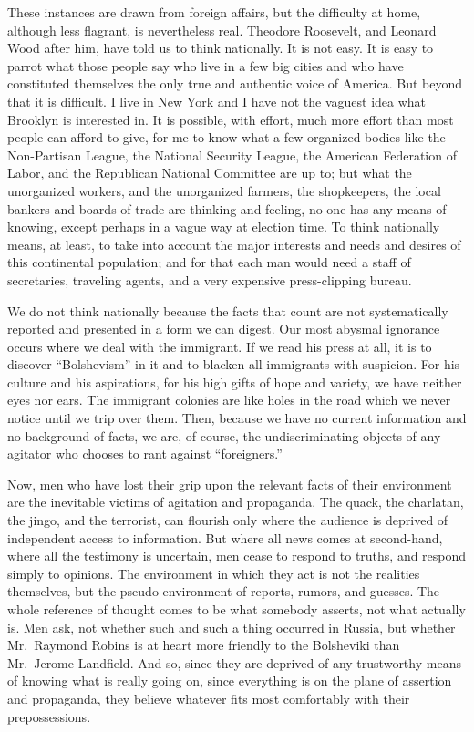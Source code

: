 \documentclass[openany,nobib,twoside,nohyper]{tufte-book}
\begin{document}
These instances are drawn from foreign affairs, but the difficulty at
home, although less flagrant, is nevertheless real. Theodore Roosevelt,
and Leonard Wood after him, have told us to think nationally. It is not
easy. It is easy to parrot what those people say who live in a few big
cities and who have constituted themselves the only true and authentic
voice of America. But beyond that it is difficult. I live in New York
and I have not the vaguest idea what Brooklyn is interested in. It is
possible, with effort, much more effort than most people can afford to
give, for me to know what a few organized bodies like the Non-Partisan
League, the National Security League, the American Federation of Labor,
and the Republican National Committee are up to; but what the
unorganized workers, and the unorganized farmers, the shopkeepers, the
local bankers and boards of trade are thinking and feeling, no one has
any means of knowing, except perhaps in a vague way at election time. To
think nationally means, at least, to take into account the major
interests and needs and desires of this continental population; and for
that each man would need a staff of secretaries, traveling agents, and a
very expensive press-clipping bureau.

We do not think nationally because the facts that count are not
systematically reported and presented in a form we can digest. Our most
abysmal ignorance occurs where we deal with the immigrant. If we read
his press at all, it is to discover ``Bolshevism'' in it and to blacken
all immigrants with suspicion. For his culture and his aspirations, for
his high gifts of hope and variety, we have neither eyes nor ears. The
immigrant colonies are like holes in the road which we never notice
until we trip over them. Then, because we have no current information
and no background of facts, we are, of course, the undiscriminating
objects of any agitator who chooses to rant against ``foreigners.''

Now, men who have lost their grip upon the relevant facts of their
environment are the inevitable victims of agitation and propaganda. The
quack, the charlatan, the jingo, and the terrorist, can flourish only
where the audience is deprived of independent access to information. But
where all news comes at second-hand, where all the testimony is
uncertain, men cease to respond to truths, and respond simply to
opinions. The environment in which they act is not the realities
themselves, but the pseudo-environment of reports, rumors, and guesses.
The whole reference of thought comes to be what somebody asserts, not
what actually is. Men ask, not whether such and such a thing occurred in
Russia, but whether Mr.~Raymond Robins is at heart more friendly to the
Bolsheviki than Mr.~Jerome Landfield. And so, since they are deprived of
any trustworthy means of knowing what is really going on, since
everything is on the plane of assertion and propaganda, they believe
whatever fits most comfortably with their prepossessions.
\end{document}
